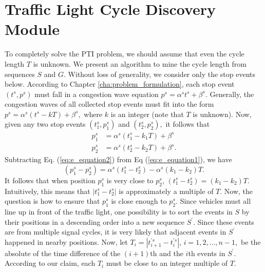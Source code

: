 \documentclass[final,oneside,onecolumn,12pt,a4paper]{book}%
\begin{document}
\bigskip

\section{Traffic Light Cycle Discovery Module}

\bigskip

\label{sec:phase_discovery}

To completely solve the PTI problem, we should assume that even the cycle
length $T$ is unknown. We present an algorithm to mine the cycle length from
sequences $S$ and $G$. Without loss of generality, we consider only the stop
events below. According to Chapter \ref{cha:problem_formulation}, each stop
event $\left(  t^{s},p^{s}\right)  $ must fall in a congestion wave equation
$p^{s}=\alpha^{s}t^{s}+\beta^{s}$. Generally, the congestion waves of all
collected stop events must fit into the form $p^{s}=\alpha^{s}\left(
t^{s}-kT\right)  +\beta^{s},$ where $k$ is an integer (note that $T$ is
unknown). Now, given any two stop events $\left(  t_{1}^{s},p_{1}^{s}\right)
$ and $\left(  t_{2}^{s},p_{2}^{s}\right)  ,$ it follows that
\begin{align}
p_{1}^{s}  &  =\alpha^{s}\left(  t_{1}^{s}-k_{1}T\right)  +\beta
^{s}\label{eq:e_equation1}\\
p_{2}^{s}  &  =\alpha^{s}\left(  t_{2}^{s}-k_{2}T\right)  +\beta^{s}.
\label{eq:e_equation2}%
\end{align}
Subtracting Eq. (\ref{eq:e_equation2}) from Eq (\ref{eq:e_equation1}), we
have
\[
\left(  p_{1}^{s}-p_{2}^{s}\right)  =\alpha^{s}\left(  t_{1}^{s}-t_{2}%
^{s}\right)  -\alpha^{s}\left(  k_{1}-k_{2}\right)  T.
\]
It follows that when position $p_{1}^{s}$ is very close to $p_{2}^{s}$,
$\left(  t_{1}^{s}-t_{2}^{s}\right)  =\left(  k_{1}-k_{2}\right)  T$.
Intuitively, this means that $\left\vert t_{1}^{s}-t_{2}^{s}\right\vert $ is
approximately a multiple of $T$. Now, the question is how to ensure that
$p_{1}^{s}$ is close enough to $p_{2}^{s}$. Since vehicles must all line up in
front of the traffic light, one possibility is to sort the events in $S$ by
their positions in a descending order into a new sequence $S^{\prime}$. Since
these events are from multiple signal cycles, it is very likely that adjacent
events in $S^{\prime}$ happened in nearby positions. Now, let $T_{i}%
=\left\vert t_{i+1}^{\prime s}-t_{i}^{\prime s}\right\vert $, $i=1,2,...,n-1,$
be the absolute of the time difference of the $\left(  i+1\right)  $th and the
$i$th events in $S^{\prime}$. According to our claim, each $T_{i}$ must be
close to an integer multiple of $T$.
\end{document}
